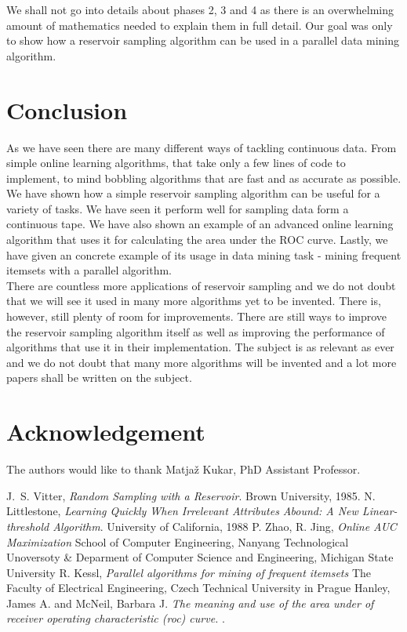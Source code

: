 \documentclass[journal]{IEEEtran/IEEEtran}
\begin{document}
We shall not go into details about phases 2, 3 and 4 as there is an overwhelming amount of mathematics needed to explain them in full detail. Our goal was only to show how a reservoir sampling algorithm can be used in a parallel data mining algorithm.
\section{Conclusion}
As we have seen there are many different ways of tackling continuous data. From simple online learning algorithms, that take only a few lines of code to implement, to mind bobbling algorithms that are fast and as accurate as possible. We have shown how a simple reservoir sampling algorithm can be useful for a variety of tasks. We have seen it perform well for sampling data form a continuous tape. We have also shown an example of an advanced online learning algorithm that uses it for calculating the area under the ROC curve. Lastly, we have given an concrete example of its usage in data mining task - mining frequent itemsets with a parallel algorithm.\\

There are countless more applications of reservoir sampling and we do not doubt that we will see it used in many more algorithms yet to be invented. There is, however, still plenty of room for improvements. There are still ways to improve the reservoir sampling algorithm itself as well as improving the performance of algorithms that use it in their implementation. The subject is as relevant as ever and we do not doubt that many more algorithms will be invented and a lot more papers shall be written on the subject. 
\appendices

\section*{Acknowledgement}
The authors would like to thank Matjaž Kukar, PhD Assistant Professor.


\begin{thebibliography}{1}
J.~S. Vitter, \emph{Random Sampling with a Reservoir}. \relax Brown University, 1985.
N. Littlestone, \emph{Learning Quickly When Irrelevant Attributes
Abound: A New Linear-threshold Algorithm}. \relax University of California, 1988
P. Zhao, R. Jing, \emph{Online AUC Maximization} \relax School of Computer Engineering, Nanyang Technological Unoversoty \& Deparment of Computer Science and Engineering, Michigan State University
R. Kessl, \emph{Parallel algorithms for mining of frequent itemsets} \relax The Faculty of Electrical Engineering, Czech Technical University in Prague
Hanley, James A. and McNeil, Barbara J. \emph{The meaning and
use of the area under of receiver operating characteristic
(roc) curve.} .

\end{thebibliography}
\end{document}
